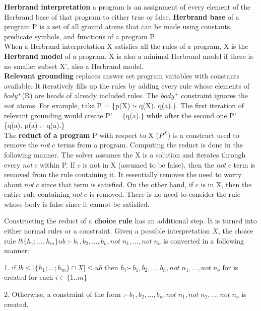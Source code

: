 \textbf{Herbrand interpretation} a program is an assignment of every element of the Herbrand base of that program to either true or false. \textbf{Herbrand base} of a program P is a set of all ground atoms that can be made using constants, predicate symbols, and functions of a program P.\\

When a Herbrand interpretation X satisfies all the rules of a program, X is the \textbf{Herbrand model} of a program. X is also a minimal Herbrand model if there is no smaller subset X', also a Herbrand model.\\

\textbf{Relevant grounding} replaces answer set program variables with constants available.
It iteratively fills up the rules by adding every rule whose elements of $body^+$(R) are heads of already included rules. 
The $body^+$ constraint ignores the $not$ atoms. 
For example, take P = \{p(X) :- q(X). q(a).\}. 
The first iteration of relevant grounding would create P' = \{q(a).\} while after the second one P' = \{q(a). p(a) :- q(a).\}\\

The \textbf{reduct of a program} P with respect to X ($P^X$) is a construct used to remove the $not\: c$ terms from a program.
Computing the reduct is done in the following manner. The solver assumes the X is a solution and iterates through every $not\: c$ within P. 
If $c$ is not in X (assumed to be false), then the $not\: c$ term is removed from the rule containing it. 
It essentially removes the need to worry about $not\: c$ since that term is satisfied.
On the other hand, if $c$ is in X, then the entire rule containing $not\: c$ is removed.
There is no need to consider the rule whose body is false since it cannot be satisfied.

Constructing the reduct of a \textbf{choice rule} has an additional step.
It is turned into either normal rules or a constraint.
Given a possible interpretation $X$, the choice rule $lb\{h_1; ..., h_m\}ub\; \text{:-} \;  b_1, b_2, ..., b_n, not\; n_1, ..., not\; n_o$ is converted in a following manner:

1. if $ lb \leq |\{h_1; ...; h_m\} \cap X| \leq ub$ then $h_i \text{:-} \;  b_1, b_2, ..., b_n, not\; n_1, ..., not\; n_o$ for is created for each $i \in \{1..m\}$

2. Otherwise, a constraint of the form $ \text{:-} \;  b_1, b_2, ..., b_n, not\; n_1, not\; n_2, ..., not\; n_o$ 
is created.\\

